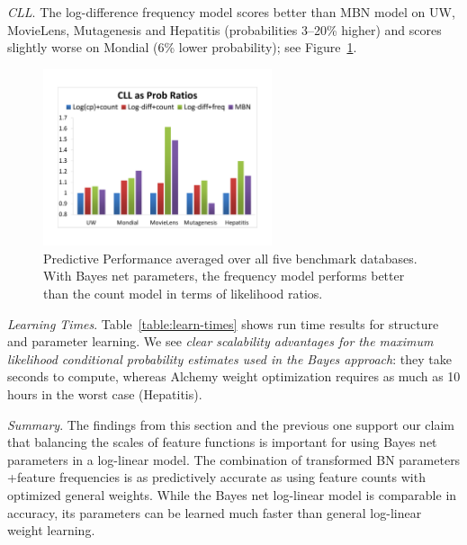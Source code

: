 \documentclass[runningheads,a4paper]{llncs}
\newcommand{\fixneeded}[1]{\textbf{[\footnotesize #1]}}
\newcommand{\point}[1]{\noindent\emph{#1}.}
\newcommand{\keypoint}[1]{{\em #1}}
\begin{document}
\point{CLL}
The log-difference frequency  model scores better than MBN model on UW, MovieLens, Mutagenesis and Hepatitis (probabilities 3--20\% higher) and scores slightly worse on Mondial (6\% lower probability); see Figure~\ref{fig:summarize}.

\begin{figure}[htbp]

\begin{center}
\includegraphics[width=0.6\textwidth]{CLL_Prob_Ratios_New}
\caption{Predictive Performance averaged over all five benchmark databases. With Bayes net parameters, the frequency model performs better than the count model in terms of likelihood ratios. 
}
\label{fig:summarize}
\end{center}
\end{figure}

\point{Learning Times}
Table~\ref{table:learn-times} shows run time results for structure and parameter learning. We see \keypoint{clear scalability advantages for the maximum likelihood conditional probability estimates used in the Bayes approach}: they take seconds to compute, whereas Alchemy weight optimization requires as much as 10 hours in the worst case (Hepatitis). 



\point{Summary} 
The findings from this section and the previous one support our claim that balancing the scales of feature functions is important for using Bayes net parameters in a log-linear model. The combination of  transformed BN parameters +feature frequencies  is as predictively accurate as using feature counts with optimized general weights.
While the Bayes net log-linear model is comparable in accuracy, its parameters can be learned much faster than general log-linear weight learning.
%
\end{document}
